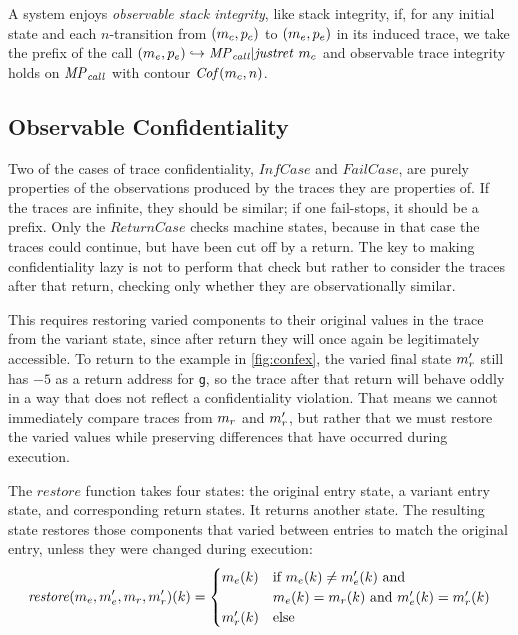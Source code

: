 \documentclass[acmsmall,review,anonymous]{acmart}\settopmatter{printfolios=true,printccs=false,printacmref=false}
\begin{document}

      A system enjoys {\em observable stack integrity}, like stack integrity,
      if, for any initial state and each \(n\)-transition from
      \((m_c,p_c)\) to \((m_e,p_e)\) in its
      induced trace, we take the prefix of the call
      \((m_e,p_e) \hookrightarrow \mathit{MP}_{\mathit{call}} | \mathit{justret}\ m_c\)
      and observable trace integrity holds on \(\mathit{MP}_{\mathit{call}}\) with
      contour \(\mathit{Cof}(m_c,n)\).

  \subsection{Observable Confidentiality}

      Two of the cases of trace confidentiality, \(\mathit{InfCase}\)
      and \(\mathit{FailCase}\), are purely properties of the
      observations produced by the traces they are properties of. If
      the traces are infinite, they should be similar; if one
      fail-stops, it should be a prefix. Only the
      \(\mathit{ReturnCase}\) checks machine states, because in that
      case the traces could continue, but have been cut off by a
      return. The key to making confidentiality lazy is not to perform that
      check but rather to consider the traces after that return,
      checking only whether they are observationally similar.

      This requires restoring varied components to their original
      values in the trace from the variant state, since after return
      they will once again be legitimately accessible. To return to
      the example in \cref{fig:confex}, the varied final state
      \(m_r'\) still has $-5$ as a return address for {\tt g}, so
      the trace after that return will behave oddly in a way that
      does not reflect a confidentiality violation.  That means we
      cannot immediately compare traces from \(m_r\) and
      \(m_r'\), but rather that we must restore the varied values
      while preserving differences that have occurred during
      execution.


      The \(\mathit{restore}\) function takes four states: the
      original entry state, a variant entry state, and corresponding return
      states. It returns another state. The resulting state restores those
      components that varied between entries to match the original entry,
      unless they were changed during execution:
      \[\mathit{restore}(m_e,m_e',m_r,m_r')
        (k) =
        \begin{cases}
          m_e(k) & \text{if } m_e(k) \not =
                                m_e'(k) \text { and } \\
          & m_e(k) = m_r(k) \text{ and }
            m_e'(k) = m_r'(k) \\
          m_r'(k) & \text{else} \\
        \end{cases}\]
\end{document}
